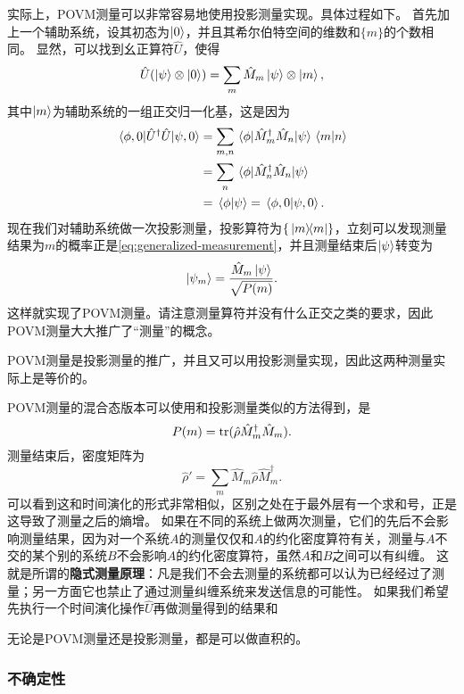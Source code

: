 \documentclass[UTF8, a4paper]{ctexart}
\begin{document}
实际上，POVM测量可以非常容易地使用投影测量实现。具体过程如下。
首先加上一个辅助系统，设其初态为$\ket{0}$，并且其希尔伯特空间的维数和$\{m\}$的个数相同。
显然，可以找到幺正算符$\hat{U}$，使得
\begin{equation}
    \hat{U} (\ket{\psi} \otimes \ket{0}) = \sum_m \hat{M}_m \ket{\psi} \otimes \ket{m},
\end{equation}
其中$\ket{m}$为辅助系统的一组正交归一化基，这是因为
\[
    \begin{aligned}
        \mel*{\phi, 0}{\hat{U}^\dagger \hat{U}}{\psi, 0} &= \sum_{m, n} \mel*{\phi}{\hat{M}^\dagger_m \hat{M}_n}{\psi} \braket*{m}{n} \\
        &= \sum_n \mel*{\phi}{\hat{M}^\dagger_n \hat{M}_n}{\psi} \\
        &= \braket*{\phi}{\psi} = \braket*{\phi, 0}{\psi, 0}.
    \end{aligned}
\]
现在我们对辅助系统做一次投影测量，投影算符为$\{\dyad*{m}{m}\}$，立刻可以发现测量结果为$m$的概率正是\eqref{eq:generalized-measurement}，并且测量结束后$\ket{\psi}$转变为
\begin{equation}
    \ket{\psi_m} = \frac{\hat{M}_m \ket{\psi}}{\sqrt{P(m)}}.
\end{equation}
这样就实现了POVM测量。请注意测量算符并没有什么正交之类的要求，因此POVM测量大大推广了“测量”的概念。

POVM测量是投影测量的推广，并且又可以用投影测量实现，因此这两种测量实际上是等价的。

POVM测量的混合态版本可以使用和投影测量类似的方法得到，是
\begin{equation}
    P(m) = \trace(\hat{\rho} \hat{M}^\dagger_m \hat{M}_m).
\end{equation}
测量结束后，密度矩阵为
\begin{equation}
    \hat{\rho}' = \sum_m \hat{M}_m \hat{\rho} \hat{M}_m^\dagger.
\end{equation}
可以看到这和时间演化的形式非常相似，区别之处在于最外层有一个求和号，正是这导致了测量之后的熵增。
如果在不同的系统上做两次测量，它们的先后不会影响测量结果，因为对一个系统$A$的测量仅仅和$A$的约化密度算符有关，测量与$A$不交的某个别的系统$B$不会影响$A$的约化密度算符，虽然$A$和$B$之间可以有纠缠。
这就是所谓的\textbf{隐式测量原理}：凡是我们不会去测量的系统都可以认为已经经过了测量；另一方面它也禁止了通过测量纠缠系统来发送信息的可能性。
如果我们希望先执行一个时间演化操作$\hat{U}$再做测量得到的结果和

无论是POVM测量还是投影测量，都是可以做直积的。

\subsubsection{不确定性}
\end{document}
